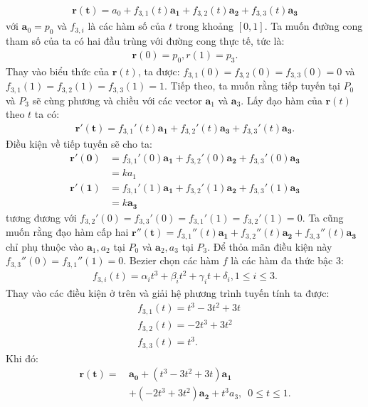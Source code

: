 \begin{multicols}{2}
\begin{align*}
		\pmb{r(t)}=a_0+f_{3,1}(t) \pmb{a_1}+f_{3,2} (t) \pmb{a_2}+f_{3,3} (t) \pmb{a_3}
	\end{align*}
	với $\pmb a_0=p_0$ và $f_{3,i}$ là các hàm số của $t$ trong khoảng $[0,1]$.
	\vskip 0.1cm 
	Ta muốn đường cong tham số của ta có hai đầu trùng với đường cong thực tế, tức là:
	\begin{align*}
		\pmb r(0)=p_0,r(1)=p_3. 
	\end{align*}
	Thay vào biểu thức của $\pmb r(t)$, ta được: $f_{3,1} (0)=f_{3,2} (0)=f_{3,3} (0)=0$ và $f_{3,1} (1)=f_{3,2}(1)=f_{3,3}(1)=1$.
	\vskip 0.1cm
	Tiếp theo, ta muốn rằng tiếp tuyến tại $P_0$ và $P_3$ sẽ cùng phương và chiều với các vector $\pmb a_1$ và $\pmb a_3$. Lấy đạo hàm của $\pmb r(t)$ theo $t$ ta có:
	\begin{align*}
		\pmb{r' (t)}=f_{3,1}' (t) \pmb{a_1}+f_{3,2}' (t) \pmb{a_3}+f_{3,3}' (t) \pmb{a_3}.
	\end{align*}
	Điều kiện về tiếp tuyến sẽ cho ta:
	\begin{align*}
		\pmb{r'(0)}&=f_{3,1}' (0) \pmb{a_1}+f_{3,2}' (0) \pmb{a_2}+f_{3,3}'(0) \pmb{a_3}\\
		&=ka_1\\
		\pmb{r'(1)}&=f_{3,1}' (1) \pmb{a_1}+f_{3,2}' (1) \pmb{a_2}+f_{3,3}'(1) \pmb{a_3}\\
		&=k\pmb{a_3}
	\end{align*}
	tương đương với $f_{3,2}' (0)=f_{3,3}' (0) = f_{3,1}' (1)=f_{3,2}' (1)=0$.
	\vskip 0.1cm
	Ta cũng muốn rằng đạo hàm cấp hai $\pmb{r''(t)}=f_{3,1}'' (t) \pmb{a_1}+f_{3,2}'' (t) \pmb{a_2}+f_{3,3}'' (t) \pmb{a_3}$ chỉ phụ thuộc vào ${\pmb a_1,a_2}$ tại $P_0$ và ${\pmb a_2,a_3}$ tại $P_3$. Để thỏa mãn điều kiện này $f_{3,3}'' (0)=f_{3,1}'' (1)=0$.
	\vskip 0.1cm
	Bezier chọn các hàm $f$ là các hàm đa thức bậc $3$:
	\begin{align*}
		f_{3,i}(t)=\alpha_i t^3 + \beta_i t^2+\gamma_i t + \delta_i,1 \le i \le 3.
	\end{align*}
	Thay vào các điều kiện ở trên và giải hệ phương trình tuyến tính ta được:
	\begin{align*}
		&f_{3,1} (t)=t^3-3t^2+3t\\
		&f_{3,2} (t)=-2t^3+3t^2\\
		&f_{3,3} (t)=t^3.
	\end{align*}
	Khi đó:
	\begin{align*}
		\pmb{r(t)}=\,&\pmb{a_0}+(t^3-3t^2+3t) \pmb{a_1}\\
		&+(-2t^3+3t^2 ) \pmb{a_2}+t^3 a_3, \,\,\,0 \le t \le 1.
	\end{align*}

\end{multicols}
